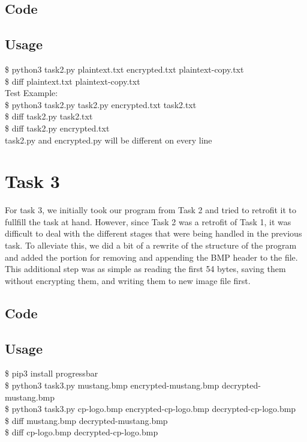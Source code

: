 \documentclass[11pt]{article}
\begin{document}
  \subsection{Code}
    
  \subsection{Usage}
    {\tt\begin{tabbing}                                                                                                                                                                     
       \$ python3 task2.py plaintext.txt encrypted.txt plaintext-copy.txt\\
       \$ diff plaintext.txt plaintext-copy.txt\\
       Test Example:\\
       \$ python3 task2.py task2.py encrypted.txt task2.txt\\
       \$ diff task2.py task2.txt\\
       \$ diff task2.py encrypted.txt\\
       task2.py and encrypted.py will be different on every line
      \end{tabbing}}

\section{Task 3}
  For task 3, we initially took our program from Task 2 and tried to retrofit 
  it to fullfill the task at hand. However, since Task 2 was a retrofit of Task 
  1, it was difficult to deal with the different stages that were being 
  handled in the previous task. To alleviate this, we did a bit of a rewrite of the
  structure of the program and added the portion for removing and appending the 
  BMP header to the file. This additional step was as simple as reading the 
  first 54 bytes, saving them without encrypting them, and writing them to new 
  image file first. 
  \subsection{Code}
    
  \subsection{Usage}
    {\tt\begin{tabbing}                                                                                                                                                                     
      \$ pip3 install progressbar\\
      \$ python3 task3.py mustang.bmp encrypted-mustang.bmp decrypted-mustang.bmp\\
      \$ python3 task3.py cp-logo.bmp encrypted-cp-logo.bmp decrypted-cp-logo.bmp\\
      \$ diff mustang.bmp decrypted-mustang.bmp\\
      \$ diff cp-logo.bmp decrypted-cp-logo.bmp\\
    \end{tabbing}}
\end{document}
